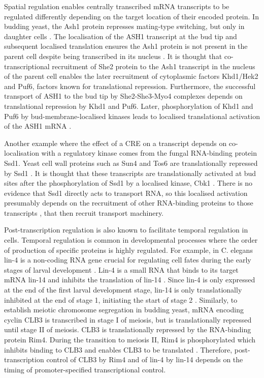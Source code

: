 \documentclass[../main.tex]{subfiles}
\begin{document}
Spatial regulation enables centrally transcribed mRNA transcripts to be regulated differently depending on the target location of their encoded protein.
In budding yeast, the Ash1 protein represses mating-type switching, but only in daughter
cells \parencite{Sil1996}.
The localisation of the ASH1 transcript at the bud tip and subsequent localised translation ensures the Ash1 protein is not present in the parent cell despite being transcribed in its nucleus \parencite{Niednery2014}. 
It is thought that co-transcriptional recruitment of She2 protein to the Ash1 transcript in the nucleus of the parent cell enables the later recruitment of cytoplasmic factors Khd1/Hek2 and Puf6, factors known for translational repression. 
Furthermore, the successful transport of ASH1 to the bud tip by She2-She3-Myo4 complexes depends on translational repression by Khd1 and Puf6. 
Later, phosphorylation of Khd1 and Puf6 by bud-membrane-localised kinases leads to localised translational activation of the ASH1 mRNA \parencite{Paquin2007, Deng2008}.

Another example where the effect of a CRE on a transcript depends on co-localisation with a regulatory kinase comes from the fungal RNA-binding protein Ssd1. 
Yeast cell wall proteins such as Sun4 and Tos6 are translationally repressed by Ssd1 \parencite{Jansen2009}.
It is thought that these transcripts are translationally activated at bud sites after the phosphorylation of Ssd1 by a localised kinase, Cbk1 \parencite{Jansen2009, Kurischko2011}. 
There is no evidence that Ssd1 directly acts to transport RNA, so this localised activation presumably depends on the recruitment of other RNA-binding proteins to those transcripts \parencite{Hogan2008, Bayne2021}, that then recruit transport machinery.

Post-transcription regulation is also known to facilitate temporal regulation in cells.  
Temporal regulation is common in developmental processes where the order of production of specific proteins is highly regulated. 
For example, in C. elegans lin-4 is a non-coding RNA gene crucial for regulating cell fates during the early stages of larval development \parencite{Wightman1993}. 
Lin-4 is a small RNA that binds to its target mRNA lin-14 and inhibits the translation of lin-14 \parencite{Lee1993}.
Since lin-4 is only expressed at the end of the first larval development stage, lin-14 is only translationally inhibited at the end of stage 1, initiating the start of stage 2 \parencite{Olsen1999}. 
Similarly, to establish meiotic chromosome segregation in budding yeast, mRNA encoding cyclin CLB3 is transcribed in stage I of meiosis, but is translationally repressed until stage II of meiosis. 
CLB3 is translationally repressed by the RNA-binding protein Rim4. 
During the transition to meiosis II, Rim4 is phosphorylated which inhibits binding to CLB3 and enables CLB3 to be translated \parencite{Berchowitz2013}. 
Therefore, post-transcription control of CLB3 by Rim4 and of lin-4 by lin-14 depends on the timing of promoter-specified transcriptional control.
\end{document}
